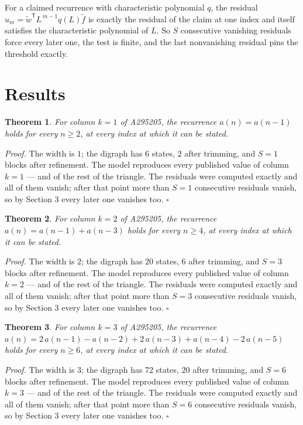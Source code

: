 \documentclass[11pt]{article}
\newtheorem{theorem}{Theorem}
\theoremstyle{definition}
\begin{document}
For a claimed recurrence with characteristic polynomial $q$, the residual $u_m = \tilde w^{\mathsf T}L^{\,m-1}q(L)\tilde f$ is exactly the residual of the claim at one index and itself satisfies the characteristic polynomial of $L$. So $S$ consecutive vanishing residuals force every later one, the test is finite, and the last nonvanishing residual pins the threshold exactly.

\section{Results}

\begin{theorem} For column $k = 1$ of A295205, the recurrence $a(n) = a(n-1)$ holds for every $n \ge 2$, at every index at which it can be stated.\end{theorem}

{\itshape Proof.} The width is $1$; the digraph has $6$ states, $2$ after trimming, and $S = 1$ blocks after refinement. The model reproduces every published value of column $k = 1$ --- and of the rest of the triangle. The residuals were computed exactly and all of them vanish; after that point more than $S = 1$ consecutive residuals vanish, so by Section 3 every later one vanishes too. $\square$

\begin{theorem} For column $k = 2$ of A295205, the recurrence $a(n) = a(n-1) + a(n-3)$ holds for every $n \ge 4$, at every index at which it can be stated.\end{theorem}

{\itshape Proof.} The width is $2$; the digraph has $20$ states, $6$ after trimming, and $S = 3$ blocks after refinement. The model reproduces every published value of column $k = 2$ --- and of the rest of the triangle. The residuals were computed exactly and all of them vanish; after that point more than $S = 3$ consecutive residuals vanish, so by Section 3 every later one vanishes too. $\square$

\begin{theorem} For column $k = 3$ of A295205, the recurrence $a(n) = 2\,a(n-1) - a(n-2) + 2\,a(n-3) + a(n-4) - 2\,a(n-5)$ holds for every $n \ge 6$, at every index at which it can be stated.\end{theorem}

{\itshape Proof.} The width is $3$; the digraph has $72$ states, $20$ after trimming, and $S = 6$ blocks after refinement. The model reproduces every published value of column $k = 3$ --- and of the rest of the triangle. The residuals were computed exactly and all of them vanish; after that point more than $S = 6$ consecutive residuals vanish, so by Section 3 every later one vanishes too. $\square$
\end{document}
